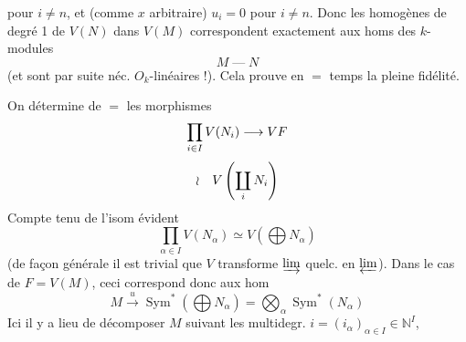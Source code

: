 pour $i\neq n$, et (comme $x$ arbitraire) $u_i=0$ pour $i\neq n$.
Donc les  homogènes de degré 1 de $V(N)$ dans $V(M)$ correspondent exactement aux homs des $k$-modules
\[
M\mathbin{\text{---}}N
\]
(et sont par suite néc. $O_k$-linéaires !). Cela prouve en $=$ temps la pleine fidélité.

On détermine de $=$ les morphismes
\[
\prod_{i\in I}V(N_i)\longrightarrow{{V}}F
\]
\[
{{\wr}\quad V\left(\coprod_iN_i\right)}
\]
Compte tenu de l'isom évident
\[
\prod_{\alpha\in I}V(N_\alpha)\simeq V\left(\bigoplus N_\alpha\right)
\]
(de façon générale il est trivial que $V$ transforme ${\varinjlim}$ quelc. en $\varprojlim$).
Dans le cas de $F=V(M)$, ceci correspond donc aux hom
\[
M\xrightarrow{u}\operatorname{Sym}^*\left(\bigoplus N_\alpha\right)
=\bigotimes_\alpha\operatorname{Sym}^*(N_\alpha)
\]
Ici il y a lieu de décomposer $M$ suivant les multidegr. $i=(i_\alpha)_{\alpha\in I}\in\mathbb{N}^I$,
